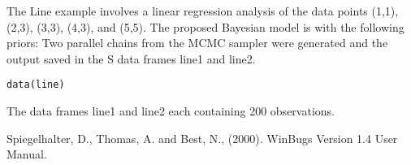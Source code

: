 \begin{Description}\relax
The Line example involves a linear regression analysis of the data points (1,1),
(2,3), (3,3), (4,3), and (5,5).  The proposed Bayesian model is
with the following priors:
Two parallel chains from the MCMC sampler were generated and the output saved in the 
S data frames line1 and line2.
\end{Description}
\begin{Usage}
\begin{verbatim}data(line)\end{verbatim}
\end{Usage}
\begin{Format}\relax
The data frames line1 and line2 each containing 200 observations.
\end{Format}
\begin{References}\relax
Spiegelhalter, D., Thomas, A. and Best, N., (2000). WinBugs Version 1.4 User
Manual.
\end{References}

